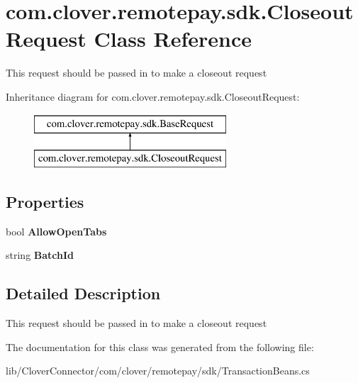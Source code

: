 \hypertarget{classcom_1_1clover_1_1remotepay_1_1sdk_1_1_closeout_request}{}\section{com.\+clover.\+remotepay.\+sdk.\+Closeout\+Request Class Reference}
\label{classcom_1_1clover_1_1remotepay_1_1sdk_1_1_closeout_request}


This request should be passed in to make a closeout request  


Inheritance diagram for com.\+clover.\+remotepay.\+sdk.\+Closeout\+Request\+:\begin{figure}[H]
\begin{center}
\leavevmode
\includegraphics[height=2.000000cm]{classcom_1_1clover_1_1remotepay_1_1sdk_1_1_closeout_request}
\end{center}
\end{figure}
\subsection*{Properties}
\begin{DoxyCompactItemize}
\item 
\mbox{\label{classcom_1_1clover_1_1remotepay_1_1sdk_1_1_closeout_request_a8cbc459862243fa018d02950986558c5}} 
bool {\bfseries Allow\+Open\+Tabs}
\item 
\mbox{\label{classcom_1_1clover_1_1remotepay_1_1sdk_1_1_closeout_request_ae6da5f308304ac9d89dc3f1d6adac939}} 
string {\bfseries Batch\+Id}
\end{DoxyCompactItemize}


\subsection{Detailed Description}
This request should be passed in to make a closeout request 



The documentation for this class was generated from the following file\+:\begin{DoxyCompactItemize}
\item 
lib/\+Clover\+Connector/com/clover/remotepay/sdk/Transaction\+Beans.\+cs\end{DoxyCompactItemize}
